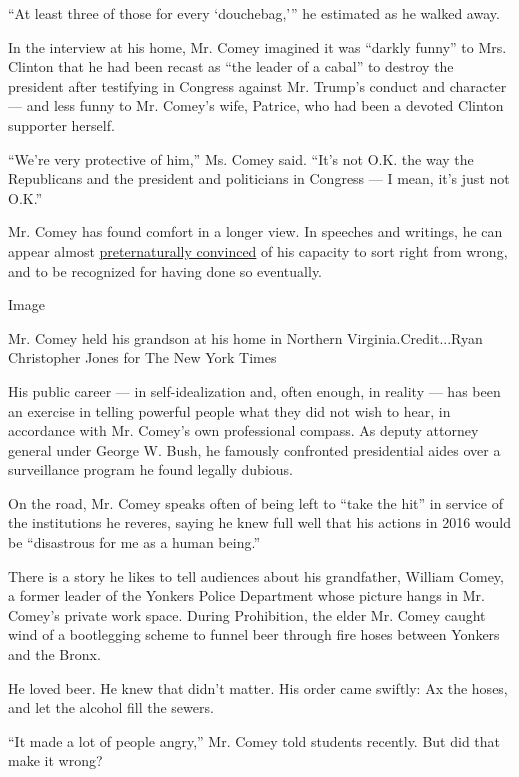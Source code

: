 ``At least three of those for every `douchebag,''' he estimated as he
walked away.

In the interview at his home, Mr. Comey imagined it was ``darkly funny''
to Mrs. Clinton that he had been recast as ``the leader of a cabal'' to
destroy the president after testifying in Congress against Mr. Trump's
conduct and character --- and less funny to Mr. Comey's wife, Patrice,
who had been a devoted Clinton supporter herself.

``We're very protective of him,'' Ms. Comey said. ``It's not O.K. the
way the Republicans and the president and politicians in Congress --- I
mean, it's just not O.K.''

Mr. Comey has found comfort in a longer view. In speeches and writings,
he can appear almost
\href{https://www.nytimes.com/2018/06/14/us/politics/james-comey-fbi-clinton-investigation-inspector-general-report.html}{preternaturally
convinced} of his capacity to sort right from wrong, and to be
recognized for having done so eventually.

Image

Mr. Comey held his grandson at his home in Northern
Virginia.Credit...Ryan Christopher Jones for The New York Times

His public career --- in self-idealization and, often enough, in reality
--- has been an exercise in telling powerful people what they did not
wish to hear, in accordance with Mr. Comey's own professional compass.
As deputy attorney general under George W. Bush, he famously confronted
presidential aides over a surveillance program he found legally dubious.

On the road, Mr. Comey speaks often of being left to ``take the hit'' in
service of the institutions he reveres, saying he knew full well that
his actions in 2016 would be ``disastrous for me as a human being.''

There is a story he likes to tell audiences about his grandfather,
William Comey, a former leader of the Yonkers Police Department whose
picture hangs in Mr. Comey's private work space. During Prohibition, the
elder Mr. Comey caught wind of a bootlegging scheme to funnel beer
through fire hoses between Yonkers and the Bronx.

He loved beer. He knew that didn't matter. His order came swiftly: Ax
the hoses, and let the alcohol fill the sewers.

``It made a lot of people angry,'' Mr. Comey told students recently. But
did that make it wrong?

